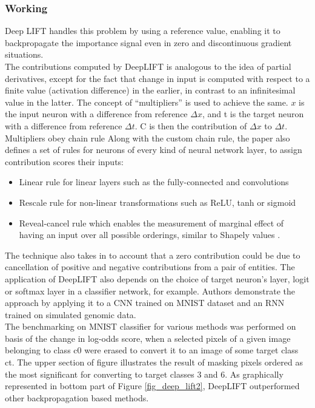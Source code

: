 \documentclass[../report.tex]{subfiles}
\begin{document}
 \subsubsection*{Working}
 Deep LIFT handles this problem by using a reference value, enabling it to backpropagate the importance signal even in zero and discontinuous gradient situations.\\
 The contributions computed by DeepLIFT is analogous to the idea of partial derivatives, except for the fact that change in input is computed with respect to a finite value (activation difference) in the earlier, in contrast to an infinitesimal value in the latter. The concept of \enquote{multipliers} is used to achieve the same.
 $x$ is the input neuron with a difference from reference $\Delta x$, and t is the target neuron with a difference from reference $\Delta t$. C is then the contribution of $\Delta x$ to $\Delta t$.
 Multipliers obey chain rule
 Along with the custom chain rule, the paper also defines a set of rules for neurons of every kind of neural network layer, to assign contribution scores their inputs:
 \begin{itemize}
 	\item Linear rule for linear layers such as the fully-connected and convolutions
 	\item Rescale rule for non-linear transformations such as ReLU, tanh or sigmoid
 	\item Reveal-cancel rule which enables the measurement of marginal effect of having an input over all possible orderings, similar to Shapely values \cite{shapley_values}. 
 \end{itemize}
The technique also takes in to account that a zero contribution could be due to cancellation of positive and negative contributions from a pair of entities. The application of DeepLIFT also depends on the choice of target neuron’s layer, logit or softmax layer in a classifier network, for example. Authors demonstrate the approach by applying it to a CNN trained on MNIST dataset \cite{lecun1998gradient} and an RNN trained on simulated genomic data.\\
The benchmarking on MNIST classifier for various methods was performed on basis of the change in log-odds score, when a selected pixels of a given image belonging to class c0 were erased to convert it to an image of some target class ct. The upper section of figure illustrates the result of masking pixels ordered as the most significant for converting to target classes 3 and 6. As graphically represented in bottom part of Figure \ref{fig_deep_lift2}, DeepLIFT outperformed other backpropagation based methods.
\end{document}

